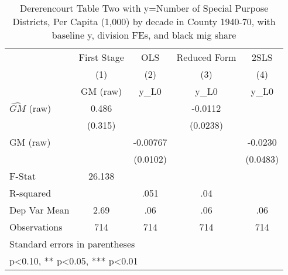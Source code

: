 \begin{table}[htbp]\centering
\def\sym#1{\ifmmode^{#1}\else\(^{#1}\)\fi}
\caption{Dererencourt Table Two with y=Number of Special Purpose Districts, Per Capita (1,000) by decade in County 1940-70, with baseline y, division FEs, and black mig share}
\begin{tabular}{l*{4}{c}}
\toprule
                    & First Stage   &         OLS   &Reduced Form   &        2SLS   \\
                    &\multicolumn{1}{c}{(1)}&\multicolumn{1}{c}{(2)}&\multicolumn{1}{c}{(3)}&\multicolumn{1}{c}{(4)}\\
                    &\multicolumn{1}{c}{GM  (raw)}&\multicolumn{1}{c}{y\_L0}&\multicolumn{1}{c}{y\_L0}&\multicolumn{1}{c}{y\_L0}\\
\midrule
$\hat{GM}$ (raw)    &       0.486   &               &     -0.0112   &               \\
                    &     (0.315)   &               &    (0.0238)   &               \\
\addlinespace
GM  (raw)           &               &    -0.00767   &               &     -0.0230   \\
                    &               &    (0.0102)   &               &    (0.0483)   \\
\midrule
F-Stat              &      26.138   &               &               &               \\
R-squared           &               &        .051   &         .04   &               \\
Dep Var Mean        &        2.69   &         .06   &         .06   &         .06   \\
Observations        &         714   &         714   &         714   &         714   \\
\bottomrule
\multicolumn{5}{l}{\footnotesize Standard errors in parentheses}\\
\multicolumn{5}{l}{\footnotesize * p<0.10, ** p<0.05, *** p<0.01}\\
\end{tabular}
\end{table}
